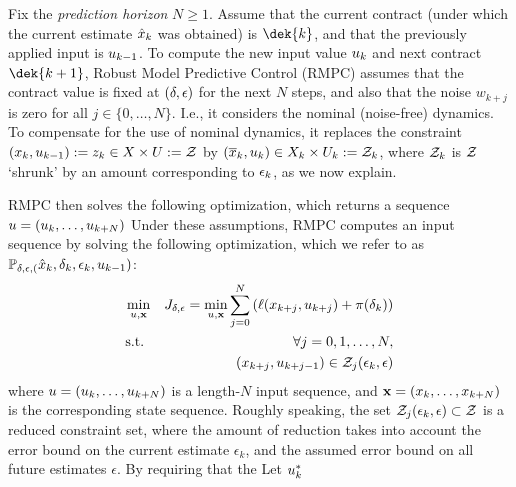 Fix the \emph{prediction horizon} $N \geq 1$.
Assume that the current contract (under which the current estimate $\hat{x}_k$ was obtained) is $\dek{k}$, and that the previously applied input is $u_{k-1}$.
To compute the new input value $u_{k}$ and next contract $\dek{k+1}$, Robust Model Predictive Control (RMPC) assumes that the contract value is fixed at $(\delta,\epsilon)$ for the next $N$ steps, and also that the noise $w_{k+j}$ is zero for all $j \in \{0,\ldots,N\}$.
I.e., it considers the nominal (noise-free) dynamics.
To compensate for the use of nominal dynamics, it replaces the constraint $(x_k,u_{k-1}):= z_k \in X \times U := \mathcal{Z}$ 
by $(\overline{x}_k,u_k) \in X_k \times U_k := \mathcal{Z}_k$,
where $\mathcal{Z}_k$ is $\mathcal{Z}$ `shrunk' by an amount corresponding to $\epsilon_k$, as we now explain. 

RMPC then solves the following optimization, which returns a sequence $u = (u_k,\ldots,u_{k+N})$
Under these assumptions, RMPC computes an input sequence by solving the following optimization, which we refer to as $\mathbb{P_{\delta,\epsilon,(}}\hat{x}_{k},\delta_k,\epsilon_k,u_{k-1})$:
\begin{eqnarray}
\min_{u,\mathbf{x}} && J_{\delta,\epsilon} = \min_{u,\mathbf{x} }\sum_{j=0}^{N}\left(\ell(x_{k+j},u_{k+j})+\pi(\delta_k)\right)
\\
\textrm{s.t. } && \forall j = 0,1,\ldots, N, 
\\
&& (x_{k+j},u_{k+j-1}) \in \mathcal{Z}_j(\epsilon_k,\epsilon)
\\
\end{eqnarray}
where $u = (u_k,\ldots,u_{k+N})$ is a length-$N$ input sequence, and $\mathbf{x} = (x_k,\ldots,x_{k+N})$ is the corresponding state sequence.
Roughly speaking, the set $\mathcal{Z}_j(\epsilon_k,\epsilon) \subset \mathcal{Z}$ is a reduced constraint set, where the amount of reduction takes into account the error bound on the current estimate $\epsilon_k$, and the assumed error bound on all future estimates $\epsilon$.
By requiring that the 
Let $u^*_k$



